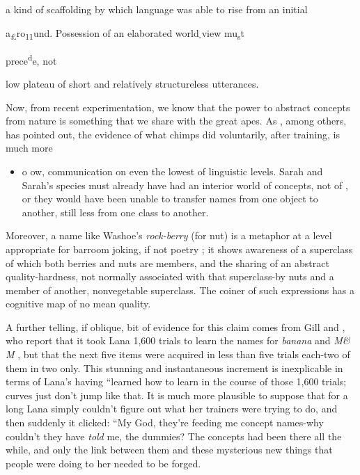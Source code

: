 a kind of scaffolding by which language was able to rise from an initial

a\textsubscript{£}ro\textsubscript{1}\textsubscript{1}und. Possession of an elaborated world\textsubscript{{}-}view mu\textsubscript{s}t

prece\textsuperscript{d}e, not

low plateau of short and relatively structureless utterances.

Now, from recent experimentation, we know that the power to abstract concepts from nature is something that we share with the great apes. As \citet{Mounin1976}, among others, has pointed out, the evidence of what chimps did voluntarily, after training, is much more

\begin{itemize}
\item o ow, communication on even the lowest of linguistic levels. Sarah and Sarah's species must already have had an interior world of con\-cepts, not of , or they would have been unable to transfer names from one object to another, still less from one class to another.
\end{itemize}


Moreover, a name like Washoe's \textit{rock-berry} (for  nut) is a meta\-phor at a level appropriate for barroom joking, if not poetry ; it shows awareness of a superclass of which both berries and nuts are members, and the sharing of an abstract quality-hardness, not normally asso\-ciated with that superclass-by nuts and a member of another, non\-vegetable superclass. The coiner of such expressions has a cognitive map of no mean quality.

A further telling, if oblique, bit of evidence for this claim comes
from Gill and \citet{Rumbaugh1974}, who report that it took Lana 1,600 trials to learn the names for \textit{banana} and \textit{M\& M} , but that the next five items were acquired in less than five trials each-two of them in two only. This stunning and instantaneous increment is inexplicable in terms of Lana's having ``learned how to learn in the course of those 1,600 trials;  curves just don't jump like that. It is much more plausible to suppose that for a long  Lana simply couldn't figure out what her trainers were trying to do, and then suddenly it clicked: ``My God, they're feeding me concept names-why couldn't they have \textit{told} me, the dummies? The concepts had been there all the while, and only the link between them and these mysterious new things that people were doing to her needed to be forged.

